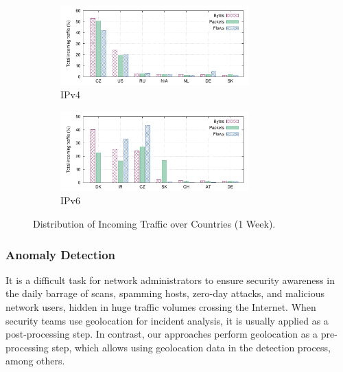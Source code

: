 \begin{figure}[!tb]
    \centering
    \begin{subfigure}[t]{\textwidth}
        \centering
        \includegraphics[width=0.8\textwidth]{figures/paper-geolocation/ipv4-ctry-breakdown/ipv4-ctry-breakdown-in}
        \caption{IPv4}
        \label{fig:geo-ipv4-traffic}
    \end{subfigure}%
    \hfill
    \begin{subfigure}[t]{\textwidth}
        \centering
        \includegraphics[width=0.8\textwidth]{figures/paper-geolocation/ipv6-ctry-breakdown/ipv6-ctry-breakdown-in}
        \caption{IPv6}
        \label{fig:geo-ipv6-traffic}
    \end{subfigure}
    \caption{Distribution of Incoming Traffic over Countries (1 Week).}
    \label{fig:geo-ip_ctry_breakdown}
\end{figure}

\subsubsection{Anomaly Detection}

It is a difficult task for network administrators to ensure security awareness in the daily barrage of scans, spamming hosts, zero-day attacks, and malicious network users, hidden in huge traffic volumes crossing the Internet. When security teams use geolocation for incident analysis, it is usually applied as a post-processing step. In contrast, our approaches perform geolocation as a pre-processing step, which allows using geolocation data in the detection process, among others.

